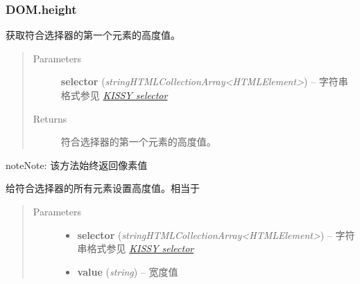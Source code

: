 \documentclass[letterpaper,10pt,english]{sphinxmanual}
\begin{document}
\subsubsection{DOM.height}
\label{api/core/dom/height::doc}\label{api/core/dom/height:dom-height}

\begin{fulllineitems}
\label{api/core/dom/height:DOM.height}
获取符合选择器的第一个元素的高度值。
\begin{quote}\begin{description}
\item[{Parameters}] \leavevmode
\textbf{selector} (\emph{string\textbar{}HTMLCollection\textbar{}Array\textless{}HTMLElement\textgreater{}}) -- 字符串格式参见 {\hyperref[api/core/dom/selector:dom-selector]{\emph{KISSY selector}}}

\item[{Returns}] \leavevmode
符合选择器的第一个元素的高度值。

\end{description}\end{quote}

\end{fulllineitems}


\begin{notice}{note}{Note:}
该方法始终返回像素值
\end{notice}


\begin{fulllineitems}
给符合选择器的所有元素设置高度值。相当于 {\hyperref[api/core/dom/css:DOM.css]{}}
\begin{quote}\begin{description}
\item[{Parameters}] \leavevmode\begin{itemize}
\item {}
\textbf{selector} (\emph{string\textbar{}HTMLCollection\textbar{}Array\textless{}HTMLElement\textgreater{}}) -- 字符串格式参见 {\hyperref[api/core/dom/selector:dom-selector]{\emph{KISSY selector}}}

\item {}
\textbf{value} (\emph{string}) -- 宽度值

\end{itemize}

\end{description}\end{quote}

\end{fulllineitems}
\end{document}
